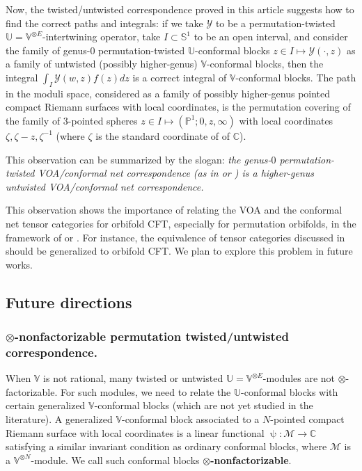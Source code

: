 \documentclass[12pt,a4paper,notitlepage]{article}
\theoremstyle{definition}
\theoremstyle{plain}
\newcommand{\mc}{\mathcal}
\newcommand{\mbb}{\mathbb}
\newcommand{\Vbb}{\mathbb V}
\newcommand{\Ubb}{\mathbb U}
\newcommand{\Cbb}{\mathbb C}
\newcommand{\Pbb}{\mathbb P}
\numberwithin{equation}{subsection}
\begin{document}
Now, the twisted/untwisted correspondence proved in this article suggests how to find the correct paths and integrals: if we take $\mc Y$ to be a permutation-twisted $\Ubb=\Vbb^{\otimes E}$-intertwining operator, take $I\subset \mbb S^1$ to be an open interval, and consider the family of genus-$0$ permutation-twisted $\Ubb$-conformal blocks $z\in I\mapsto \mc Y(\cdot,z)$ as a family of untwisted (possibly higher-genus) $\Vbb$-conformal blocks, then the integral $\int_I \mc Y(w,z)f(z)dz$ is a correct integral of $\Vbb$-conformal blocks. The path in the moduli space, considered as a family of possibly higher-genus pointed compact Riemann surfaces with local coordinates, is the permutation covering of the family of $3$-pointed spheres $z\in I\mapsto (\Pbb^1;0,z,\infty)$ with local coordinates $\zeta,\zeta-z,\zeta^{-1}$ (where $\zeta$ is the standard coordinate of of $\Cbb$). 

This observation can be summarized by the slogan: \emph{the genus-$0$ permutation-twisted VOA/conformal net correspondence (as in \cite{CKLW18} or \cite{Ten19a}) is a higher-genus untwisted VOA/conformal net correspondence.}

This observation shows the  importance of relating the VOA and the conformal net tensor categories  for orbifold CFT, especially for permutation orbifolds, in the framework of \cite{CKLW18} or \cite{Ten19a}. For instance, the equivalence of tensor categories discussed in \cite{Gui21a,Gui20a} should be generalized to orbifold CFT. We plan to explore this problem in future works.




\subsection{Future directions}



\subsubsection*{$\otimes$-nonfactorizable permutation twisted/untwisted correspondence.}

	

When $\Vbb$ is not rational, many twisted or untwisted  $\Ubb=\Vbb^{\otimes E}$-modules are not $\otimes$-factorizable. For such modules, we need to relate the $\Ubb$-conformal blocks with certain generalized $\Vbb$-conformal blocks (which are not yet studied in the literature). A generalized $\Vbb$-conformal block associated to a $N$-pointed compact Riemann surface with local coordinates is a linear functional $\uppsi:\mc M\rightarrow\Cbb$ satisfying a similar invariant condition as ordinary conformal blocks, where $\mc M$ is a $\Vbb^{\otimes N}$-module. We call such conformal blocks \textbf{$\otimes$-nonfactorizable}. 
\end{document}

